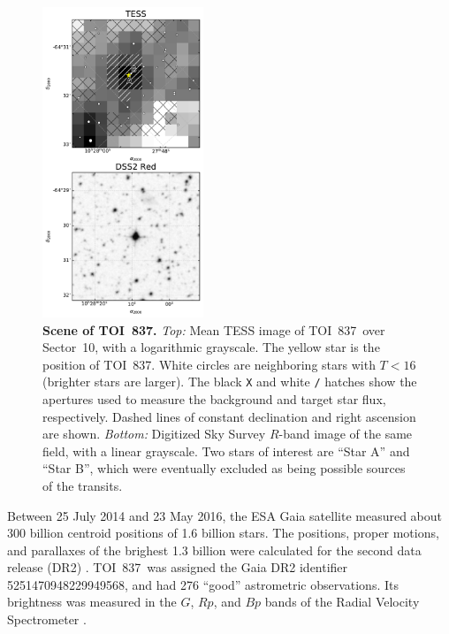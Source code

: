 \documentclass[12pt,twocolumn,tighten]{aastex63}
\newcommand{\tn}{TOI~837} %
\begin{document}
\begin{figure}[!t]
	\begin{center}
		\leavevmode
		\includegraphics[width=0.43\textwidth]{f5.pdf}
	\end{center}
	\vspace{-0.7cm}
	\caption{ {\bf Scene of \tn.}
    {\it Top:} Mean TESS image of \tn\ over Sector~10, with a
    logarithmic grayscale. The yellow star is the position of \tn.
    White circles are neighboring stars with $T<16$ (brighter stars
    are larger). The black \texttt{X} and white \texttt{/} hatches
    show the apertures used to measure the background and target star
    flux, respectively. Dashed lines of constant declination and right
    ascension are shown.  {\it Bottom:} Digitized Sky Survey $R$-band
    image of the same field, with a linear grayscale.  Two stars of
    interest are ``Star A'' and ``Star B'', which were eventually
    excluded as being possible sources of the transits.
		\label{fig:scene}
	}
\end{figure}

Between 25 July 2014 and 23 May 2016, the ESA Gaia satellite measured
about 300 billion centroid positions of 1{.}6 billion stars.  The
positions, proper motions, and parallaxes of the brighest 1{.}3
billion were calculated for the second data release (DR2)
\citep{gaia_collaboration_gaia_2016,lindegren_gaiasoln_2018,gaia_collaboration_gaia_2018}.
\tn\ was assigned the Gaia DR2 identifier 5251470948229949568, and had
276 ``good'' astrometric observations. Its brightness was measured in
the $G$, $Rp$, and $Bp$ bands of the Radial Velocity Spectrometer
\citep{cropper_gaia_2018,evans_gaia_2018}.  
\end{document}
